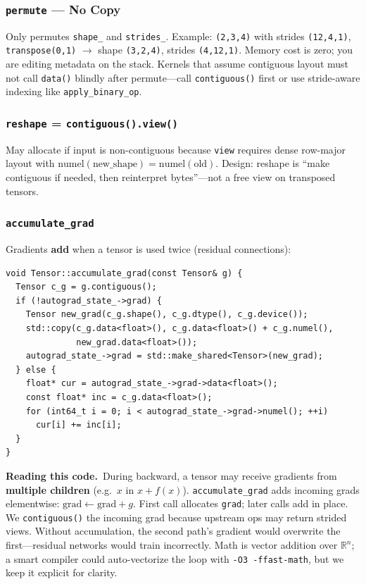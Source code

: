 \documentclass[11pt,a4paper]{article}
\newcommand{\explain}{\par\smallskip\noindent}
\newcommand{\exhead}{\textbf{Reading this code.}\ }
\begin{document}
\subsubsection{\texttt{permute} --- No Copy}

Only permutes \texttt{shape\_} and \texttt{strides\_}. Example: \texttt{(2,3,4)} with
strides \texttt{(12,4,1)}, \texttt{transpose(0,1)} $\rightarrow$ shape \texttt{(3,2,4)},
strides \texttt{(4,12,1)}. Memory cost is zero; you are editing metadata on the stack. Kernels
that assume contiguous layout must not call \texttt{data()} blindly after permute---call
\texttt{contiguous()} first or use stride-aware indexing like \texttt{apply\_binary\_op}.

\subsubsection{\texttt{reshape} = \texttt{contiguous().view()}}

May allocate if input is non-contiguous because \texttt{view} requires dense row-major layout
with $\text{numel}(\text{new\_shape}) = \text{numel}(\text{old})$. Design: reshape is ``make
contiguous if needed, then reinterpret bytes''---not a free view on transposed tensors.

\subsubsection{\texttt{accumulate\_grad}}

Gradients \textbf{add} when a tensor is used twice (residual connections):
\begin{lstlisting}[style=cpp]
void Tensor::accumulate_grad(const Tensor& g) {
  Tensor c_g = g.contiguous();
  if (!autograd_state_->grad) {
    Tensor new_grad(c_g.shape(), c_g.dtype(), c_g.device());
    std::copy(c_g.data<float>(), c_g.data<float>() + c_g.numel(),
              new_grad.data<float>());
    autograd_state_->grad = std::make_shared<Tensor>(new_grad);
  } else {
    float* cur = autograd_state_->grad->data<float>();
    const float* inc = c_g.data<float>();
    for (int64_t i = 0; i < autograd_state_->grad->numel(); ++i)
      cur[i] += inc[i];
  }
}
\end{lstlisting}
\explain\exhead During backward, a tensor may receive gradients from \textbf{multiple children}
(e.g.\ $x$ in $x + f(x)$). \texttt{accumulate\_grad} adds incoming grads elementwise:
$\text{grad} \leftarrow \text{grad} + g$. First call allocates \texttt{grad}; later calls
add in place. We \texttt{contiguous()} the incoming grad because upstream ops may return
strided views. Without accumulation, the second path's gradient would overwrite the first---residual
networks would train incorrectly. Math is vector addition over $\mathbb{R}^n$; a smart compiler
could auto-vectorize the loop with \texttt{-O3 -ffast-math}, but we keep it explicit for clarity.
\end{document}

